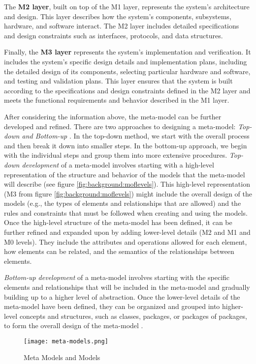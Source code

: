 The \textbf{M2 layer}, built on top of the M1 layer, represents the system's architecture and design. 
This layer describes how the system's components, subsystems, hardware, and software interact.
The M2 layer includes detailed specifications and design constraints such as interfaces, protocols, and data structures.

Finally, the \textbf{M3 layer} represents the system's implementation and verification. 
It includes the system's specific design details and implementation plans, including the detailed design of its components, selecting particular hardware and software, and testing and validation plans. 
This layer ensures that the system is built according to the specifications and design constraints defined in the M2 layer and meets the functional requirements and behavior described in the M1 layer.

After considering the information above, the meta-model can be further developed and refined. 
There are two approaches to designing a meta-model: \textit{Top-down and Bottom-up} \cite{misc:mbse:mof}. 
In the top-down method, we start with the overall process and then break it down into smaller steps. 
In the bottom-up approach, we begin with the individual steps and group them into more extensive procedures.
\textit{Top-down development} of a meta-model involves starting with a high-level representation of the structure and behavior of the models that the meta-model will describe (see figure \ref{fig:background:moflevels}). 
This high-level representation (M3 from figure \ref{fig:background:moflevels}) might include the overall design of the models (e.g., the types of elements and relationships that are allowed) and the rules and constraints that must be followed when creating and using the models.
Once the high-level structure of the meta-model has been defined, it can be further refined and expanded upon by adding lower-level details (M2 and M1 and M0 levels). 
They include the attributes and operations allowed for each element, how elements can be related, and the semantics of the relationships between elements.

\textit{Bottom-up development} of a meta-model involves starting with the specific elements and relationships that will be included in the meta-model and gradually building up to a higher level of abstraction. 
Once the lower-level details of the meta-model have been defined, they can be organized and grouped into higher-level concepts and structures, such as classes, packages, or packages of packages, to form the overall design of the meta-model \cite{misc:mbse:mof}.
\begin{figure}[htbp!]
  \centering    
  \texttt{[image: meta-models.png]}
  \caption[Meta Models]{Meta Models and Models}
  \label{fig:background:m1m2}
\end{figure}


